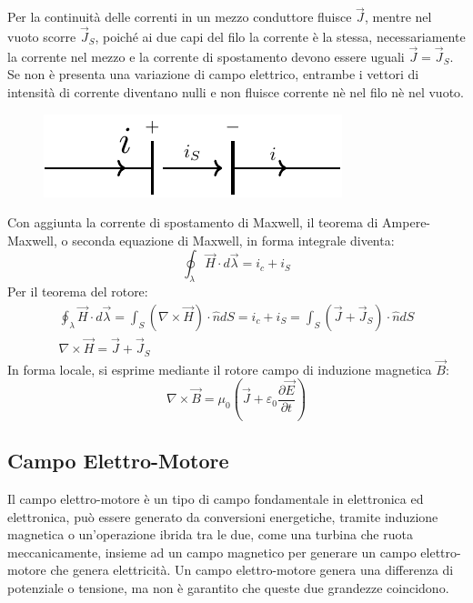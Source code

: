 \documentclass{article}
\numberwithin{equation}{subsection}
\begin{document}
Per la continuità delle correnti in un mezzo conduttore fluisce $\vec{J}$, mentre nel vuoto scorre $\vec{J}_S$, poiché ai due capi del filo la corrente è la stessa, necessariamente 
la corrente nel mezzo e la corrente di spostamento devono essere uguali $\vec{J}=\vec{J}_S$. Se non è presenta una variazione di campo elettrico, entrambe i vettori 
di intensità di corrente diventano nulli e non fluisce corrente nè nel filo nè nel vuoto.  

\begin{figure}[H]%
    \centering
    \includegraphics{corrente-filo-reciso.pdf}
    \label{fig:corrente-filo-reciso}
\end{figure}

Con aggiunta la corrente di spostamento di Maxwell, il teorema di Ampere-Maxwell, o seconda equazione di Maxwell, in forma integrale diventa:
\begin{equation*}
    \oint_{\lambda}\vec{H}\cdot d\vec{\lambda}=i_c+i_S
\end{equation*}
Per il teorema del rotore:
\begin{gather*}
    \displaystyle\oint_{\lambda}\vec{H}\cdot d\vec{\lambda}=\int_S(\nabla\times\vec{H})\cdot\hat{n}dS=i_c+i_S=\int_S(\vec{J}+\vec{J}_S)\cdot\hat{n}dS\\
    \nabla\times\vec{H}=\vec{J}+\vec{J}_S
\end{gather*}
In forma locale, si esprime mediante il rotore campo di induzione magnetica $\vec{B}$:
\begin{equation}
    \nabla\times\vec{B}=\mu_0\left(\vec{J}+\varepsilon_0\displaystyle\frac{\partial \vec{E}}{\partial t}\right)
\end{equation}

\subsection{Campo Elettro-Motore}

Il campo elettro-motore è un tipo di campo fondamentale in elettronica ed elettronica, può essere generato da conversioni energetiche, tramite induzione magnetica o un'operazione 
ibrida tra le due, come una turbina che ruota meccanicamente, insieme ad un campo magnetico per generare un campo elettro-motore che genera elettricità. Un campo elettro-motore 
genera una differenza di potenziale o tensione, ma non è garantito che queste due grandezze coincidono. 
\end{document}
